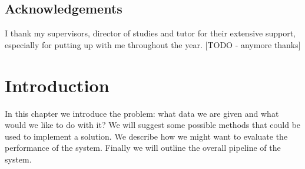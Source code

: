 \documentclass[12pt,twoside,notitlepage]{report}
\begin{document}
\listoffigures

\listoftables

\lstlistoflistings











\newpage
\section*{Acknowledgements}

I thank my supervisors, director of studies and tutor for their extensive support, especially for putting up with me 
throughout the year. [TODO - anymore thanks] %











\cleardoublepage        %

\setcounter{page}{1}
\pagestyle{headings}
















\cleardoublepage
\chapter{Introduction}
    In this chapter we introduce the problem: what data we are given and what would we like to do with it? We will 
    suggest some possible methods that could be used to implement a solution. We describe how we might want to 
    evaluate the performance of the system. Finally we will outline the overall pipeline of the system.
\end{document}
